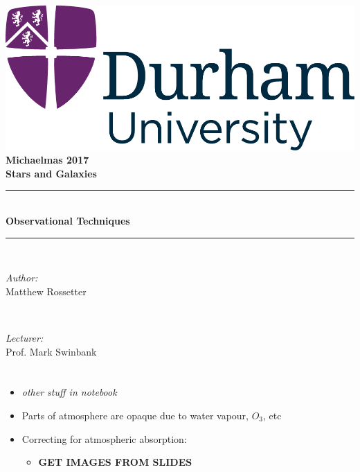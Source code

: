 \documentclass[a4paper,11pt,normalem]{article}
\newcommand{\HRule}{\rule{\linewidth}{0.5mm}}
\begin{document}
{\centering
{\includegraphics[scale=0.5]{../../logo0.png}\hfill{\Large\bfseries Michaelmas 2017}}\\[1.5cm]
{\LARGE\bfseries Stars and Galaxies}\\[0.5cm]
\HRule \\[0.3cm]
{\huge\bfseries Observational Techniques}\\[0.1cm]
\HRule \\[1cm]}
\begin{center}
\begin{minipage}{0.4\textwidth}
    \begin{flushleft} \large
        \emph{Author:} \\ Matthew Rossetter
    \end{flushleft}
\end{minipage}~
\begin{minipage}{0.4\textwidth}
    \begin{flushright} \large
        \emph{Lecturer:} \\ Prof. Mark Swinbank
    \end{flushright}
\end{minipage}
\end{center}

\section{}
\begin{itemize}
    \item \emph{other stuff in notebook}
    \item Parts of atmosphere are opaque due to water vapour, \(O_3\), etc
    \item Correcting for atmospheric absorption:
        \begin{itemize}
            \item\textbf{GET IMAGES FROM SLIDES}
        \end{itemize}
\end{itemize}
\end{document}
